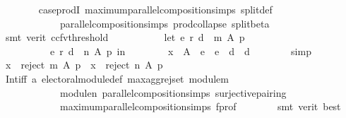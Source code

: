 \begin{isabellebody}
\ \ \ \ \ \ \isamarkupfalse%
\ case{\isacharunderscore}{\kern0pt}prodI{}\ maximum{\isacharunderscore}{\kern0pt}parallel{\isacharunderscore}{\kern0pt}composition{\isachardot}{\kern0pt}simps\ split{\isacharunderscore}{\kern0pt}def\isanewline
\ \ \ \ \ \ \ \ \ \ \ \ parallel{\isacharunderscore}{\kern0pt}composition{\isachardot}{\kern0pt}simps\ prod{\isachardot}{\kern0pt}collapse\ split{\isacharunderscore}{\kern0pt}beta\isanewline
\ \ \ \ \ \ \isamarkupfalse%
\ {\isacharparenleft}{\kern0pt}smt\ {\isacharparenleft}{\kern0pt}verit{\isacharcomma}{\kern0pt}\ ccfv{\isacharunderscore}{\kern0pt}threshold{\isacharparenright}{\kern0pt}{\isacharparenright}{\kern0pt}\isanewline
\ \ \ \ \isamarkupfalse%
\isanewline
\ \ \ \ \ \ {\isachardoublequoteopen}let\ {\isacharparenleft}{\kern0pt}e{}{\isacharcomma}{\kern0pt}\ r{}{\isacharcomma}{\kern0pt}\ d{}{\isacharparenright}{\kern0pt}\ {\isacharequal}{\kern0pt}\ m\ A\ p{\isacharsemicolon}{\kern0pt}\isanewline
\ \ \ \ \ \ \ \ \ \ {\isacharparenleft}{\kern0pt}e{}{\isacharcomma}{\kern0pt}\ r{}{\isacharcomma}{\kern0pt}\ d{}{\isacharparenright}{\kern0pt}\ {\isacharequal}{\kern0pt}\ n\ A\ p\ in\isanewline
\ \ \ \ \ \ \ \ x\ {\isasymin}\ A\ {\isacharminus}{\kern0pt}\ {\isacharparenleft}{\kern0pt}e{}\ {\isasymunion}\ e{}\ {\isasymunion}\ d{}\ {\isasymunion}\ d{}{\isacharparenright}{\kern0pt}{\isachardoublequoteclose}\isanewline
\ \ \ \ \ \ \isamarkupfalse%
\ simp\isanewline
\ \ \ \ \isamarkupfalse%
\ {\isachardoublequoteopen}x\ {\isasymin}\ reject\ m\ A\ p\ {\isasymand}\ x\ {\isasymin}\ reject\ n\ A\ p{\isachardoublequoteclose}\isanewline
\ \ \ \ \ \ \isamarkupfalse%
\ Int{\isacharunderscore}{\kern0pt}iff\ a\ electoral{\isacharunderscore}{\kern0pt}module{\isacharunderscore}{\kern0pt}def\ max{\isacharunderscore}{\kern0pt}agg{\isacharunderscore}{\kern0pt}rej{\isacharunderscore}{\kern0pt}set\ module{\isacharunderscore}{\kern0pt}m\isanewline
\ \ \ \ \ \ \ \ \ \ \ \ module{\isacharunderscore}{\kern0pt}n\ parallel{\isacharunderscore}{\kern0pt}composition{\isachardot}{\kern0pt}simps\ surjective{\isacharunderscore}{\kern0pt}pairing\isanewline
\ \ \ \ \ \ \ \ \ \ \ \ maximum{\isacharunderscore}{\kern0pt}parallel{\isacharunderscore}{\kern0pt}composition{\isachardot}{\kern0pt}simps\ f{\isacharunderscore}{\kern0pt}prof\isanewline
\ \ \ \ \ \ \isamarkupfalse%
\ {\isacharparenleft}{\kern0pt}smt\ {\isacharparenleft}{\kern0pt}verit{\isacharcomma}{\kern0pt}\ best{\isacharparenright}{\kern0pt}{\isacharparenright}{\kern0pt}\isanewline

\end{isabellebody}
